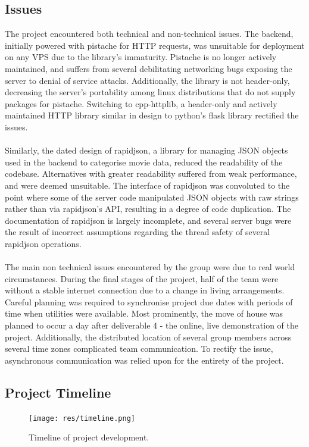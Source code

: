 \documentclass{article}
\begin{document}
\subsection{Issues}
The project encountered both technical and non-technical issues. The backend,
initially powered with pistache for HTTP requests, was unsuitable for
deployment on any VPS due to the library's immaturity. Pistache is no longer
actively maintained, and suffers from several debilitating networking bugs
exposing the server to denial of service attacks. Additionally, the library is
not header-only, decreasing the server's portability among linux distributions
that do not supply packages for pistache. Switching to cpp-httplib, a
header-only and actively maintained HTTP library similar in design to python's
flask library rectified the issues. \\\\
Similarly, the dated design of rapidjson, a
library for managing JSON objects used in the backend to categorise movie data,
reduced the readability of the codebase. Alternatives with greater readability
suffered from weak performance, and were deemed unsuitable. The interface of
rapidjson was convoluted to the point where some of the server code manipulated
JSON objects with raw strings rather than via rapidjson's API, resulting in
a degree of code duplication. The documentation of rapidjson is largely
incomplete, and several server bugs were the result of incorrect assumptions
regarding the thread safety of several rapidjson operations.\\\\
The main non technical issues encountered by the group were due to real world
circumstances. During the final stages of the project, half of the team were
without a stable internet connection due to a change in living arrangements.
Careful planning was required to synchronise project due dates with periods
of time when utilities were available. Most prominently, the move of house
was planned to occur a day after deliverable 4 - the online, live demonstration
of the project. Additionally, the distributed location of several group members
across several time zones complicated team communication. To rectify the issue,
asynchronous communication was relied upon for the entirety of the project.
\subsection{Project Timeline}
\begin{figure}[H]
\texttt{[image: res/timeline.png]}
\caption{Timeline of project development.}
\end{figure}
\end{document}
